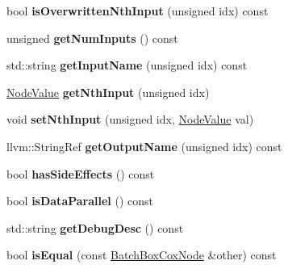 \begin{DoxyCompactItemize}
bool {\bfseries is\+Overwritten\+Nth\+Input} (unsigned idx) const
\item 
\mbox{\label{classglow_1_1_batch_box_cox_node_a5f80fc446ccc5bcb3c2692ba40d2df28}} 
unsigned {\bfseries get\+Num\+Inputs} () const
\item 
\mbox{\label{classglow_1_1_batch_box_cox_node_ad61e7b16bb288715f2b0c67533476942}} 
std\+::string {\bfseries get\+Input\+Name} (unsigned idx) const
\item 
\mbox{\label{classglow_1_1_batch_box_cox_node_a8056eb12ab724e64dcb2d04477551ada}} 
\hyperlink{structglow_1_1_node_value}{Node\+Value} {\bfseries get\+Nth\+Input} (unsigned idx)
\item 
\mbox{\label{classglow_1_1_batch_box_cox_node_a5a00e307ded346db0cf3943e39832d4c}} 
void {\bfseries set\+Nth\+Input} (unsigned idx, \hyperlink{structglow_1_1_node_value}{Node\+Value} val)
\item 
\mbox{\label{classglow_1_1_batch_box_cox_node_a60373a442dffc7dfbc8c09e6701c98c2}} 
llvm\+::\+String\+Ref {\bfseries get\+Output\+Name} (unsigned idx) const
\item 
\mbox{\label{classglow_1_1_batch_box_cox_node_a33326dd391b8313fc581e0ce6a931d6f}} 
bool {\bfseries has\+Side\+Effects} () const
\item 
\mbox{\label{classglow_1_1_batch_box_cox_node_a5e02e47eb0aa78976aa40ccddec93eaa}} 
bool {\bfseries is\+Data\+Parallel} () const
\item 
\mbox{\label{classglow_1_1_batch_box_cox_node_ab99ccba84d87613189803042433811ad}} 
std\+::string {\bfseries get\+Debug\+Desc} () const
\item 
\mbox{\label{classglow_1_1_batch_box_cox_node_a9cdc5e245ee2fa64c9291dc2229282a9}} 
bool {\bfseries is\+Equal} (const \hyperlink{classglow_1_1_batch_box_cox_node}{Batch\+Box\+Cox\+Node} \&other) const
\item 

\end{DoxyCompactItemize}
